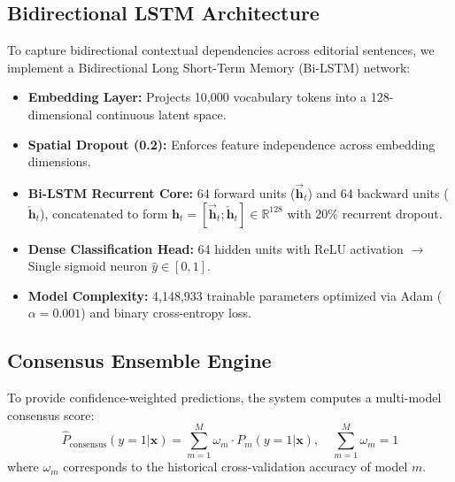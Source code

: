 \documentclass[11pt,a4paper]{article}
\begin{document}
\subsection{Bidirectional LSTM Architecture}
To capture bidirectional contextual dependencies across editorial sentences, we implement a Bidirectional Long Short-Term Memory (Bi-LSTM) network:
\begin{itemize}[leftmargin=*]
    \item \textbf{Embedding Layer:} Projects 10,000 vocabulary tokens into a 128-dimensional continuous latent space.
    \item \textbf{Spatial Dropout (0.2):} Enforces feature independence across embedding dimensions.
    \item \textbf{Bi-LSTM Recurrent Core:} 64 forward units ($\overrightarrow{\mathbf{h}}_t$) and 64 backward units ($\overleftarrow{\mathbf{h}}_t$), concatenated to form $\mathbf{h}_t = [\overrightarrow{\mathbf{h}}_t; \overleftarrow{\mathbf{h}}_t] \in \mathbb{R}^{128}$ with 20\% recurrent dropout.
    \item \textbf{Dense Classification Head:} 64 hidden units with ReLU activation $\to$ Single sigmoid neuron $\hat{y} \in [0, 1]$.
    \item \textbf{Model Complexity:} 4,148,933 trainable parameters optimized via Adam ($\alpha = 0.001$) and binary cross-entropy loss.
\end{itemize}

\subsection{Consensus Ensemble Engine}
To provide confidence-weighted predictions, the system computes a multi-model consensus score:
\begin{equation}
\hat{P}_{\text{consensus}}(y=1|\mathbf{x}) = \sum_{m=1}^M \omega_m \cdot P_m(y=1|\mathbf{x}), \quad \sum_{m=1}^M \omega_m = 1
\end{equation}
where $\omega_m$ corresponds to the historical cross-validation accuracy of model $m$.

\end{document}
